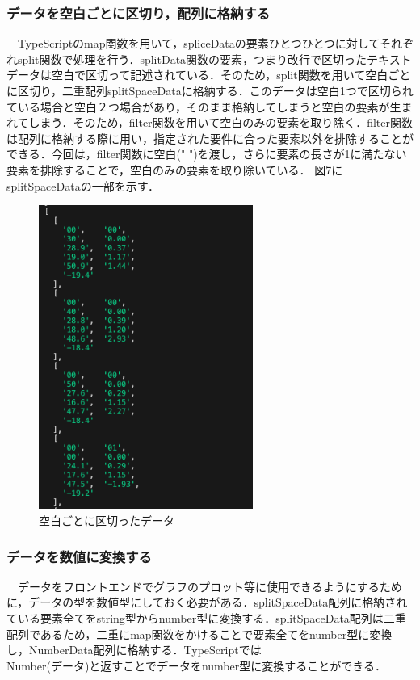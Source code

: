  \subsubsection{データを空白ごとに区切り，配列に格納する}
　TypeScriptのmap関数を用いて，spliceDataの要素ひとつひとつに対してそれぞれsplit関数で処理を行う．splitData関数の要素，つまり改行で区切ったテキストデータは空白で区切って記述されている．そのため，split関数を用いて空白ごとに区切り，二重配列splitSpaceDataに格納する．このデータは空白1つで区切られている場合と空白２つ場合があり，そのまま格納してしまうと空白の要素が生まれてしまう．そのため，filter関数を用いて空白のみの要素を取り除く．filter関数は配列に格納する際に用い，指定された要件に合った要素以外を排除することができる．今回は，filter関数に空白(" ")を渡し，さらに要素の長さが1に満たない要素を排除することで，空白のみの要素を取り除いている．
 図7にsplitSpaceDataの一部を示す．
 \begin{figure}[ht]
   \centering
   \includegraphics[width=70mm]{fig/splitSpaceData.png}
   \caption{空白ごとに区切ったデータ}
 \end{figure}
 
 \subsubsection{データを数値に変換する}
 　データをフロントエンドでグラフのプロット等に使用できるようにするために，データの型を数値型にしておく必要がある．splitSpaceData配列に格納されている要素全てをstring型からnumber型に変換する．splitSpaceData配列は二重配列であるため，二重にmap関数をかけることで要素全てをnumber型に変換し，NumberData配列に格納する．TypeScriptでは\\Number(データ)と返すことでデータをnumber型に変換することができる．
 
